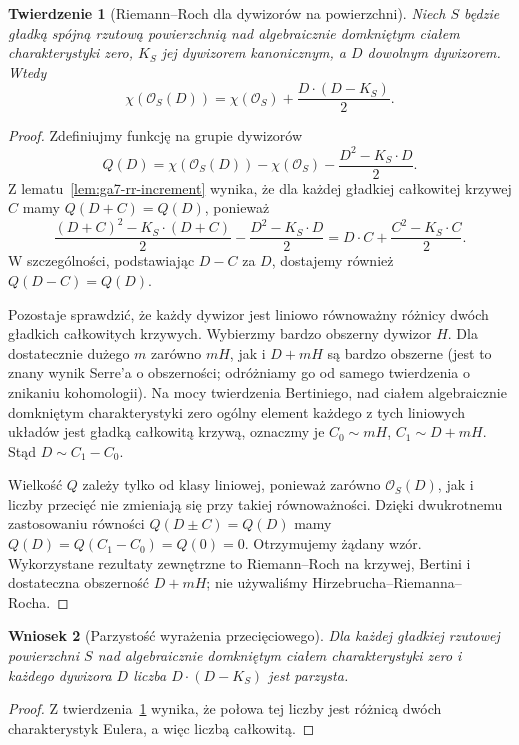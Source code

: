\documentclass[11pt,a4paper,openany]{report}
\numberwithin{equation}{section}
\theoremstyle{plain}
\newtheorem{twierdzenie}{Twierdzenie}[section]
\newtheorem{wniosek}[twierdzenie]{Wniosek}
\theoremstyle{definition}
\theoremstyle{remark}
\begin{document}
\begin{twierdzenie}[Riemann--Roch dla dywizorów na powierzchni]
\label{tw:ga7-rr-surfaces}
Niech $S$ będzie gładką spójną rzutową powierzchnią
nad algebraicznie domkniętym ciałem charakterystyki zero,
$K_S$ jej dywizorem kanonicznym, a $D$ dowolnym dywizorem.
Wtedy
\[
\chi(\mathcal O_S(D))=\chi(\mathcal O_S)
+\frac{D\cdot(D-K_S)}{2}.
\]
\end{twierdzenie}
\begin{proof}
Zdefiniujmy funkcję na grupie dywizorów
\[
Q(D)=\chi(\mathcal O_S(D))-\chi(\mathcal O_S)
-\frac{D^2-K_S\cdot D}{2}.
\]
Z lematu~\ref{lem:ga7-rr-increment} wynika, że
dla każdej gładkiej całkowitej krzywej $C$ mamy
$Q(D+C)=Q(D)$, ponieważ
\[
\frac{(D+C)^2-K_S\cdot(D+C)}{2}
-\frac{D^2-K_S\cdot D}{2}
=D\cdot C+\frac{C^2-K_S\cdot C}{2}.
\]
W szczególności, podstawiając $D-C$ za $D$,
dostajemy również $Q(D-C)=Q(D)$.

Pozostaje sprawdzić, że każdy dywizor jest liniowo
równoważny różnicy dwóch gładkich całkowitych krzywych.
Wybierzmy bardzo obszerny dywizor $H$.
Dla dostatecznie dużego $m$ zarówno $mH$,
jak i $D+mH$ są bardzo obszerne (jest to znany
wynik Serre'a o obszerności; odróżniamy go od
samego twierdzenia o znikaniu kohomologii).
Na mocy twierdzenia Bertiniego, nad ciałem
algebraicznie domkniętym charakterystyki zero
ogólny element każdego z tych liniowych układów
jest gładką całkowitą krzywą, oznaczmy je
$C_0\sim mH$, $C_1\sim D+mH$.
Stąd $D\sim C_1-C_0$.

Wielkość $Q$ zależy tylko od klasy liniowej,
ponieważ zarówno $\mathcal O_S(D)$, jak i liczby
przecięć nie zmieniają się przy takiej równoważności.
Dzięki dwukrotnemu zastosowaniu równości
$Q(D\pm C)=Q(D)$ mamy
$Q(D)=Q(C_1-C_0)=Q(0)=0$.
Otrzymujemy żądany wzór. Wykorzystane rezultaty
zewnętrzne to Riemann--Roch na krzywej,
Bertini i dostateczna obszerność $D+mH$;
nie używaliśmy Hirzebrucha--Riemanna--Rocha.
\end{proof}

\begin{wniosek}[Parzystość wyrażenia przecięciowego]
\label{wn:ga7-parity}
Dla każdej gładkiej rzutowej powierzchni $S$ nad
algebraicznie domkniętym ciałem charakterystyki zero
i każdego dywizora $D$ liczba
$D\cdot(D-K_S)$ jest parzysta.
\end{wniosek}
\begin{proof}
Z twierdzenia~\ref{tw:ga7-rr-surfaces} wynika,
że połowa tej liczby jest różnicą dwóch
charakterystyk Eulera, a więc liczbą całkowitą.
\end{proof}
\end{document}
